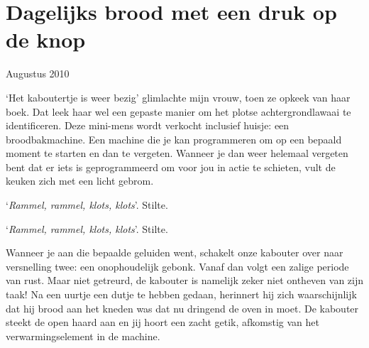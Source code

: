 \documentclass[
  11pt,
  dutch,
]{memoir}
\begin{document}
\hypertarget{dagelijks-brood-met-een-druk-op-de-knop}{%
\section{Dagelijks brood met een druk op de
knop}\label{dagelijks-brood-met-een-druk-op-de-knop}}

\begin{flushright}
Augustus 2010
\end{flushright}

`Het kaboutertje is weer bezig' glimlachte mijn vrouw, toen ze opkeek
van haar boek. Dat leek haar wel een gepaste manier om het plotse
achtergrondlawaai te identificeren. Deze mini-mens wordt verkocht
inclusief huisje: een broodbakmachine. Een machine die je kan
programmeren om op een bepaald moment te starten en dan te vergeten.
Wanneer je dan weer helemaal vergeten bent dat er iets is geprogrammeerd
om voor jou in actie te schieten, vult de keuken zich met een licht
gebrom.

`\emph{Rammel, rammel, klots, klots}'. Stilte.

`\emph{Rammel, rammel, klots, klots}'. Stilte.

Wanneer je aan die bepaalde geluiden went, schakelt onze kabouter over
naar versnelling twee: een onophoudelijk gebonk. Vanaf dan volgt een
zalige periode van rust. Maar niet getreurd, de kabouter is namelijk
zeker niet ontheven van zijn taak! Na een uurtje een dutje te hebben
gedaan, herinnert hij zich waarschijnlijk dat hij brood aan het kneden
was dat nu dringend de oven in moet. De kabouter steekt de open haard
aan en jij hoort een zacht getik, afkomstig van het verwarmingselement
in de machine.
\end{document}
